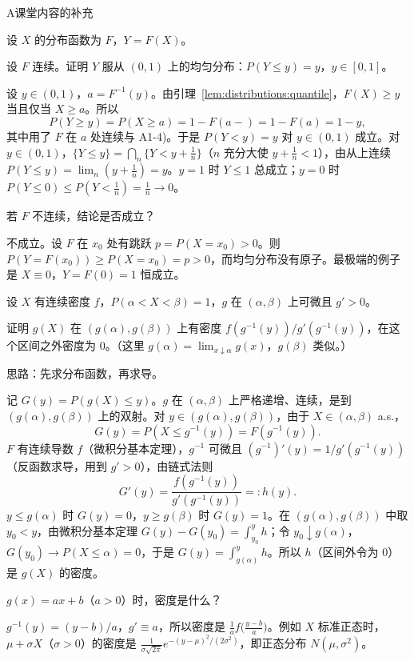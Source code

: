 \begin{exercises}{A}{课堂内容的补充}
\item\label{ex:distributions:A2} 设 $X$ 的分布函数为 $F$，$Y=F(X)$。
\begin{questions}
\item 设 $F$ 连续。证明 $Y$ 服从 $(0,1)$ 上的均匀分布：$P(Y\leqslant y)=y$，$y\in[0,1]$。
\begin{solution}
设 $y\in(0,1)$，$a=F^{-1}(y)$。由引理~\ref{lem:distributions:quantile}，$F(X)\geqslant y$ 当且仅当 $X\geqslant a$。所以
\[
P(Y\geqslant y)=P(X\geqslant a)=1-F(a-)=1-F(a)=1-y,
\]
其中用了 $F$ 在 $a$ 处连续与 A1-4)。于是 $P(Y<y)=y$ 对 $y\in(0,1)$ 成立。对 $y\in(0,1)$，$\{Y\leqslant y\}=\bigcap_n\{Y<y+\frac1n\}$（$n$ 充分大使 $y+\frac1n<1$），由从上连续 $P(Y\leqslant y)=\lim_n(y+\frac1n)=y$。$y=1$ 时 $Y\leqslant1$ 总成立；$y=0$ 时 $P(Y\leqslant0)\leqslant P(Y<\frac1n)=\frac1n\to0$。
\end{solution}
\item 若 $F$ 不连续，结论是否成立？
\begin{solution}
不成立。设 $F$ 在 $x_0$ 处有跳跃 $p=P(X=x_0)>0$。则 $P(Y=F(x_0))\geqslant P(X=x_0)=p>0$，而均匀分布没有原子。最极端的例子是 $X\equiv0$，$Y=F(0)=1$ 恒成立。
\end{solution}
\end{questions}

\item\label{ex:distributions:A3} 设 $X$ 有连续密度 $f$，$P(\alpha<X<\beta)=1$，$g$ 在 $(\alpha,\beta)$ 上可微且 $g'>0$。
\begin{questions}
\item 证明 $g(X)$ 在 $(g(\alpha),g(\beta))$ 上有密度 $f(g^{-1}(y))/g'(g^{-1}(y))$，在这个区间之外密度为 $0$。（这里 $g(\alpha)=\lim_{x\downarrow\alpha}g(x)$，$g(\beta)$ 类似。）
\begin{solution}
思路：先求分布函数，再求导。

记 $G(y)=P(g(X)\leqslant y)$。$g$ 在 $(\alpha,\beta)$ 上严格递增、连续，是到 $(g(\alpha),g(\beta))$ 上的双射。对 $y\in(g(\alpha),g(\beta))$，由于 $X\in(\alpha,\beta)$ a.s.，
\[
G(y)=P(X\leqslant g^{-1}(y))=F(g^{-1}(y)).
\]
$F$ 有连续导数 $f$（微积分基本定理），$g^{-1}$ 可微且 $(g^{-1})'(y)=1/g'(g^{-1}(y))$（反函数求导，用到 $g'>0$），由链式法则
\[
G'(y)=\frac{f(g^{-1}(y))}{g'(g^{-1}(y))}=:h(y).
\]
$y\leqslant g(\alpha)$ 时 $G(y)=0$，$y\geqslant g(\beta)$ 时 $G(y)=1$。在 $(g(\alpha),g(\beta))$ 中取 $y_0<y$，由微积分基本定理 $G(y)-G(y_0)=\int_{y_0}^yh$；令 $y_0\downarrow g(\alpha)$，$G(y_0)\to P(X\leqslant\alpha)=0$，于是 $G(y)=\int_{g(\alpha)}^yh$。所以 $h$（区间外令为 $0$）是 $g(X)$ 的密度。
\end{solution}
\item $g(x)=ax+b$（$a>0$）时，密度是什么？
\begin{solution}
$g^{-1}(y)=(y-b)/a$，$g'\equiv a$，所以密度是 $\frac1af\bigl(\frac{y-b}a\bigr)$。例如 $X$ 标准正态时，$\mu+\sigma X$（$\sigma>0$）的密度是 $\frac1{\sigma\sqrt{2\pi}}e^{-(y-\mu)^2/(2\sigma^2)}$，即正态分布 $N(\mu,\sigma^2)$。
\end{solution}
\end{questions}


\end{exercises}
